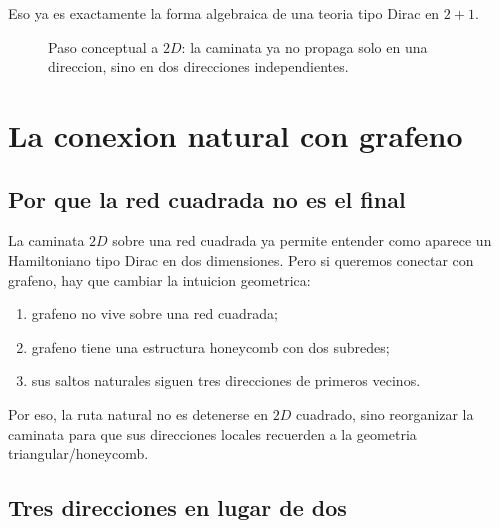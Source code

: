 Eso ya es exactamente la forma algebraica de una teoria tipo Dirac en \(2+1\).

\begin{figure}[ht]
\centering
{}
\caption{Paso conceptual a \(2D\): la caminata ya no propaga solo en una direccion, sino en dos direcciones independientes.}
\label{c04:fig:2d-square}
\end{figure}

\section{La conexion natural con grafeno}

\subsection{Por que la red cuadrada no es el final}

La caminata \(2D\) sobre una red cuadrada ya permite entender como aparece un Hamiltoniano tipo Dirac en dos dimensiones. Pero si queremos conectar con grafeno, hay que cambiar la intuicion geometrica:

\begin{enumerate}[leftmargin=*]
  \item grafeno no vive sobre una red cuadrada;
  \item grafeno tiene una estructura honeycomb con dos subredes;
  \item sus saltos naturales siguen tres direcciones de primeros vecinos.
\end{enumerate}

Por eso, la ruta natural no es detenerse en \(2D\) cuadrado, sino reorganizar la caminata para que sus direcciones locales recuerden a la geometria triangular/honeycomb.

\subsection{Tres direcciones en lugar de dos}

